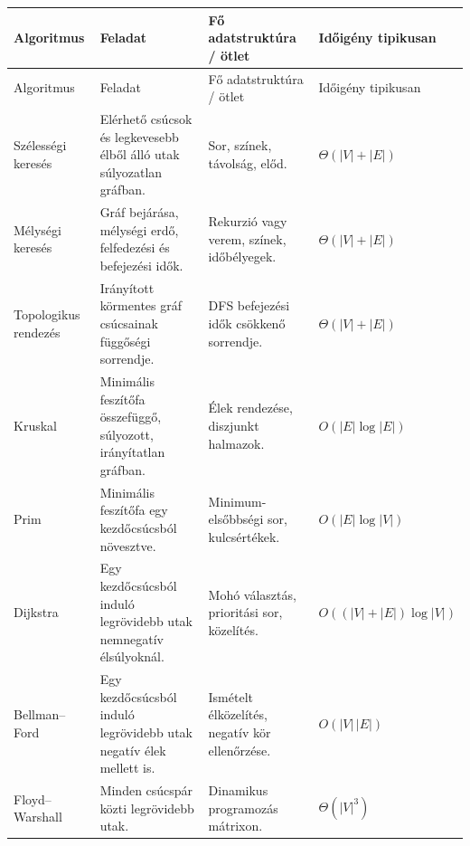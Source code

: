 \begingroup
\setlength{\tabcolsep}{3.5pt}
\begin{longtable}{L{0.20\textwidth}L{0.31\textwidth}L{0.22\textwidth}L{0.17\textwidth}}
\toprule
Algoritmus & Feladat & Fő adatstruktúra / ötlet & Időigény tipikusan \\
\midrule
\endfirsthead
\toprule
Algoritmus & Feladat & Fő adatstruktúra / ötlet & Időigény tipikusan \\
\midrule
\endhead
Szélességi keresés & Elérhető csúcsok és legkevesebb élből álló utak súlyozatlan gráfban. & Sor, színek, távolság, előd. & $\Theta(|V|+|E|)$ \\
Mélységi keresés & Gráf bejárása, mélységi erdő, felfedezési és befejezési idők. & Rekurzió vagy verem, színek, időbélyegek. & $\Theta(|V|+|E|)$ \\
Topologikus rendezés & Irányított körmentes gráf csúcsainak függőségi sorrendje. & DFS befejezési idők csökkenő sorrendje. & $\Theta(|V|+|E|)$ \\
Kruskal & Minimális feszítőfa összefüggő, súlyozott, irányítatlan gráfban. & Élek rendezése, diszjunkt halmazok. & $O(|E|\log |E|)$ \\
Prim & Minimális feszítőfa egy kezdőcsúcsból növesztve. & Minimum-elsőbbségi sor, kulcsértékek. & $O(|E|\log |V|)$ \\
Dijkstra & Egy kezdőcsúcsból induló legrövidebb utak nemnegatív élsúlyoknál. & Mohó választás, prioritási sor, közelítés. & $O((|V|+|E|)\log |V|)$ \\
Bellman--Ford & Egy kezdőcsúcsból induló legrövidebb utak negatív élek mellett is. & Ismételt élközelítés, negatív kör ellenőrzése. & $O(|V|\,|E|)$ \\
Floyd--Warshall & Minden csúcspár közti legrövidebb utak. & Dinamikus programozás mátrixon. & $\Theta(|V|^3)$ \\
\bottomrule
\end{longtable}
\endgroup
